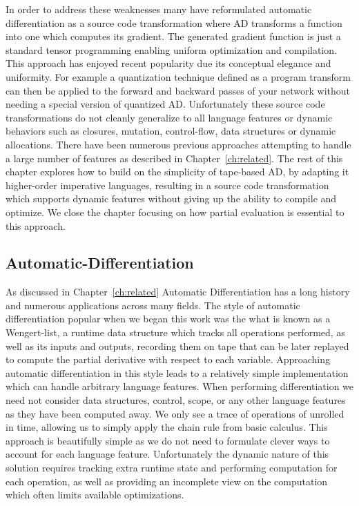 In order to address these weaknesses many have reformulated
  automatic differentiation as a source code transformation
  where AD transforms a function into one which computes its gradient.
The generated gradient function is just a standard tensor programming
  enabling uniform optimization and compilation.
This approach has enjoyed recent popularity due its conceptual
  elegance and uniformity.
For example a quantization technique defined as a program
  transform can then be applied to the forward and backward passes
  of your network without needing a special version of quantized AD.
Unfortunately these source code transformations do not cleanly
  generalize to all language features or dynamic behaviors such
  as closures, mutation, control-flow, data structures or dynamic allocations.
There have been numerous previous approaches attempting to handle a large number
  of features as described in Chapter~\ref{ch:related}.
The rest of this chapter explores how to build on the simplicity of
  tape-based AD, by adapting it higher-order imperative languages,
  resulting in a source code transformation which supports dynamic features
  without giving up the ability to compile and optimize.
We close the chapter focusing on how partial evaluation is essential to this
  approach.

\subsection{Automatic-Differentiation}

As discussed in Chapter~\ref{ch:related} Automatic Differentiation has a long history
  and numerous applications across many fields.
The style of automatic differentiation popular when we began this work was the
  what is known as a Wengert-list, a runtime data structure which tracks
  all operations performed, as well as its inputs and outputs, recording them on tape
  that can be later replayed to compute the partial derivative with respect to each variable.
Approaching automatic differentiation in this style leads to a relatively simple
  implementation which can handle arbitrary language features.
When performing differentiation we need not consider data
  structures, control, scope, or any other language features as they
  have been computed away.
We only see a trace of operations of unrolled in time, allowing us
  to simply apply the chain rule from basic calculus.
This approach is beautifully simple as we do not need to formulate
  clever ways to account for each language feature.
Unfortunately the dynamic nature of this solution requires tracking extra runtime state
  and performing computation for each operation, as well as providing an incomplete
  view on the computation which often limits available optimizations.

